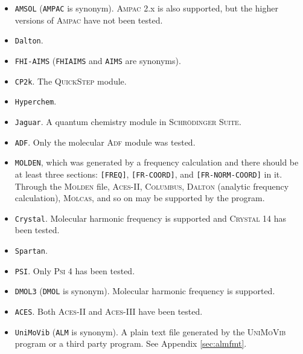 \documentclass[12pt,english]{extarticle}
\begin{document}
\begin{itemize}
\item \verb|AMSOL| (\verb|AMPAC| is synonym). \textsc{Ampac} 2.x is also supported, but the higher versions of \textsc{Ampac} have not been tested.
\item \verb|Dalton|.
\item \verb|FHI-AIMS| (\verb|FHIAIMS| and \verb|AIMS| are synonyms).
\item \verb|CP2k|. The \textsc{QuickStep} module.
\item \verb|Hyperchem|.
\item \verb|Jaguar|. A quantum chemistry module in \textsc{Schr\"odinger Suite}.
\item \verb|ADF|. Only the molecular \textsc{Adf} module was tested.
\item \verb|MOLDEN|, which was generated by a frequency calculation and there should be at
least three sections: \verb|[FREQ]|, \verb|[FR-COORD]|, and \verb|[FR-NORM-COORD]| in it. Through the
\textsc{Molden} file, \textsc{Aces-II}, \textsc{Columbus}, \textsc{Dalton} (analytic frequency calculation), \textsc{Molcas}, and so on may be supported by the program.
\item \verb|Crystal|. Molecular harmonic frequency is supported and \textsc{Crystal} 14 has been tested.
\item \verb|Spartan|.
\item \verb|PSI|. Only \textsc{Psi} 4 has been tested.
\item \verb|DMOL3| (\verb|DMOL| is synonym). Molecular harmonic frequency is supported.
\item \verb|ACES|. Both \textsc{Aces-II} and \textsc{Aces-III} have been tested.
\item \verb|UniMoVib| (\verb|ALM| is synonym). A plain text file generated by the \textsc{UniMoVib} program or a third party program. See Appendix \ref{sec:almfmt}.
\end{itemize}
\end{document}

